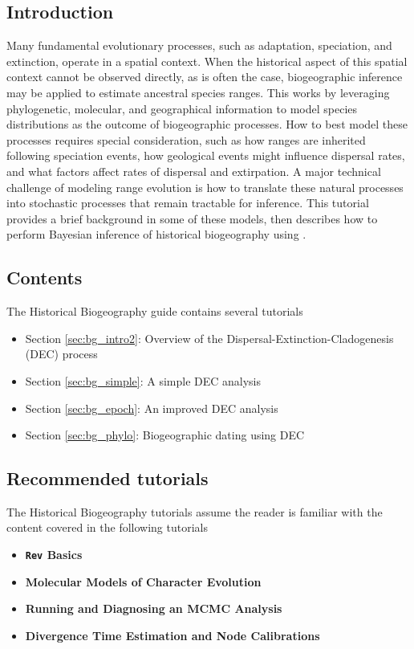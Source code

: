 \subsection*{Introduction}

Many fundamental evolutionary processes, such as adaptation, speciation, and extinction, operate in a spatial context. 
When the historical aspect of this spatial context cannot be observed directly, as is often the case, biogeographic inference may be applied to estimate ancestral species ranges.
This works by leveraging phylogenetic, molecular, and geographical information to model species distributions as the outcome of biogeographic processes.
How to best model these processes requires special consideration, such as how ranges are inherited following speciation events, how geological events might influence dispersal rates, and what factors affect rates of dispersal and extirpation.
A major technical challenge of modeling range evolution is how to translate these natural processes into stochastic processes that remain tractable for inference.
This tutorial provides a brief background in some of these models, then describes how to perform Bayesian inference of historical biogeography using \RevBayes.

\subsection*{Contents}

The Historical Biogeography guide contains several tutorials

\begin{itemize}
\item Section \ref{sec:bg_intro2}: Overview of the Dispersal-Extinction-Cladogenesis (DEC) process
\item Section \ref{sec:bg_simple}: A simple DEC analysis
\item Section \ref{sec:bg_epoch}: An improved DEC analysis
\item Section \ref{sec:bg_phylo}: Biogeographic dating using DEC
\end{itemize}

\subsection*{Recommended tutorials}

The Historical Biogeography tutorials assume the reader is familiar with the content covered in the following \RevBayes tutorials

\begin{itemize}
\item {\bf {\tt \large Rev} Basics}
\item {\bf Molecular Models of Character Evolution}
\item {\bf Running and Diagnosing an MCMC Analysis}
\item {\bf Divergence Time Estimation and Node Calibrations}
\end{itemize}

\newpage
